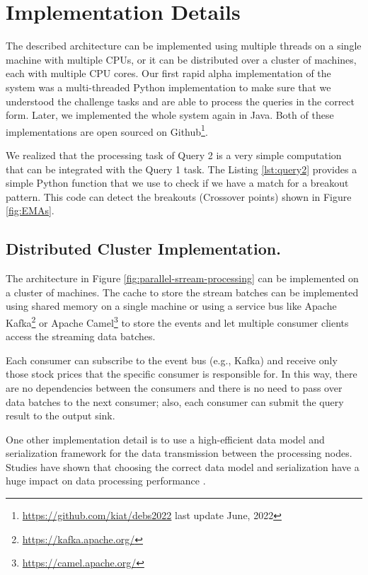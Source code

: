 \section{Implementation Details}\label{sec:implementation}
The described architecture can be implemented using multiple threads on a single machine with multiple CPUs, or it can be distributed over a cluster of machines, each with multiple CPU cores.
Our first rapid alpha implementation of the system was a multi-threaded Python implementation to make sure that we understood the challenge tasks and are able to process the queries in the correct form.
Later, we implemented the whole system again in Java. Both of these implementations are open sourced on Github\footnote{\url{https://github.com/kiat/debs2022} last update June, 2022}.


We realized that the processing task of Query 2 is a very simple computation that can be integrated with the Query 1 task.
The Listing \ref{lst:query2} provides a simple Python function that we use to check if we have a match for a breakout pattern.
This code can detect the breakouts (Crossover points) shown in Figure \ref{fig:EMAs}.



\subsection{Distributed Cluster Implementation.}
The architecture in Figure \ref{fig:parallel-srream-processing} can be implemented on a cluster of machines. The cache to store the stream batches can be implemented using shared memory on a single machine or using a service bus like Apache Kafka\footnote{\url{https://kafka.apache.org/}} or Apache Camel\footnote{\url{https://camel.apache.org/}} to store
the events and let multiple consumer clients access the streaming data batches.

Each consumer can subscribe to the event bus (e.g., Kafka) and receive only those stock prices that the specific consumer is responsible
for. In this way, there are no dependencies between the consumers and there is no need to pass over data batches to the next
consumer; also, each consumer can submit the query result to the output sink.

One other implementation detail is to use a high-efficient data model and serialization framework for the data transmission between
the processing nodes. Studies have shown that choosing the correct data model and serialization have a huge impact on data processing performance \cite{DBLP:conf/cloud/SikdarTJ17}.

